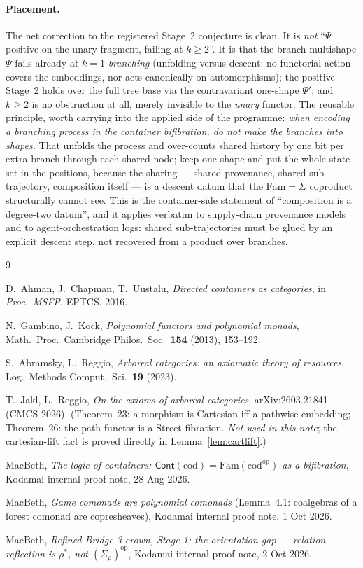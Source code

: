 \documentclass[11pt]{article}
\theoremstyle{definition}
\newcommand{\Cont}{\mathsf{Cont}}
\newcommand{\Fam}{\mathrm{Fam}}
\newcommand{\cod}{\mathrm{cod}}
\newcommand{\op}{\mathrm{op}}
\newcommand{\Psip}{\Psi'}
\begin{document}
\paragraph{Placement.}
The net correction to the registered Stage~2 conjecture is clean. It is \emph{not} ``$\Psi$ positive
on the unary fragment, failing at $k\ge2$''. It is that the branch-multishape $\Psi$ fails already
at $k=1$ \emph{branching} (unfolding versus descent: no functorial action covers the embeddings, nor
acts canonically on automorphisms); the positive Stage~2
holds over the full tree base via the contravariant one-shape $\Psip$; and $k\ge2$ is no obstruction
at all, merely invisible to the \emph{unary} functor. The reusable principle, worth carrying into the
applied side of the programme: \emph{when encoding a branching process in the container bifibration,
do not make the branches into shapes.} That unfolds the process and over-counts shared history by
one bit per extra branch through each shared node; keep one shape and put the whole state set in the
positions, because the sharing --- shared provenance, shared sub-trajectory, composition itself ---
is a descent datum that the $\Fam=\Sigma$ coproduct structurally cannot see. This is the
container-side statement of ``composition is a degree-two datum'', and it applies verbatim to
supply-chain provenance models and to agent-orchestration logs: shared sub-trajectories must be
glued by an explicit descent step, not recovered from a product over branches.

\begin{thebibliography}{9}

D.~Ahman, J.~Chapman, T.~Uustalu,
\emph{Directed containers as categories},
in \emph{Proc.\ MSFP}, EPTCS, 2016.

N.~Gambino, J.~Kock,
\emph{Polynomial functors and polynomial monads},
Math.\ Proc.\ Cambridge Philos.\ Soc.\ \textbf{154} (2013), 153--192.

S.~Abramsky, L.~Reggio,
\emph{Arboreal categories: an axiomatic theory of resources},
Log.\ Methods Comput.\ Sci.\ \textbf{19} (2023).

T.~Jakl, L.~Reggio,
\emph{On the axioms of arboreal categories},
arXiv:2603.21841 (CMCS 2026).
(Theorem~23: a morphism is Cartesian iff a pathwise embedding; Theorem~26: the path functor is a
Street fibration. \emph{Not used in this note}; the cartesian-lift fact is proved directly in
Lemma~\ref{lem:cartlift}.)

MacBeth,
\emph{The logic of containers: $\Cont(\cod)=\Fam(\cod^\op)$ as a bifibration},
Kodamai internal proof note, 28 Aug 2026.

MacBeth,
\emph{Game comonads are polynomial comonads} (Lemma~4.1: coalgebras of a forest comonad are
copresheaves),
Kodamai internal proof note, 1 Oct 2026.

MacBeth,
\emph{Refined Bridge-3 crown, Stage 1: the orientation gap --- relation-reflection is $\rho^*$,
not $(\Sigma_\rho)^\op$},
Kodamai internal proof note, 2 Oct 2026.

\end{thebibliography}
\end{document}
